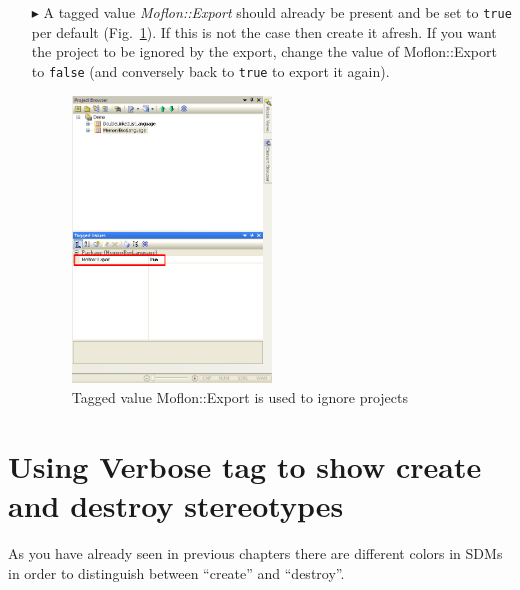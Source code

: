 \begin{enumerate}
\item[$\blacktriangleright$] A tagged value \emph{Moflon::Export} should already be present and be set to \texttt{true} per default (Fig.~\ref{fig_ignoreExportingProject02}). 
If this is not the case then create it afresh.
If you want the project to be ignored by the export, change the value of Moflon::Export to \texttt{false} (and conversely back to \texttt{true} to export it again).
\begin{figure}[htbp]
\begin{center}
\includegraphics[width=0.5\textwidth]{pics/tricks/ignoreExportingProject/ignoreExportingProject2}
  \caption{Tagged value Moflon::Export is used to ignore projects}  
  \label{fig_ignoreExportingProject02}
\end{center}
\end{figure}
\end{enumerate}


\section{Using Verbose tag to show create and destroy stereotypes} As you have already seen in previous chapters there are different colors in SDMs in 
order to distinguish between ``create'' and ``destroy''.


